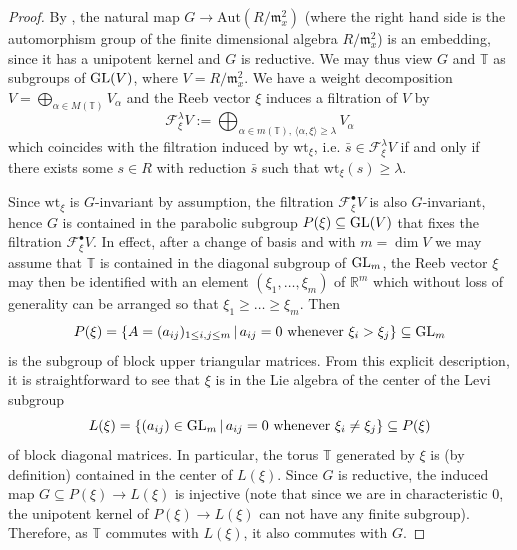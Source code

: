 \documentclass[12pt]{amsart}
\theoremstyle{definition}
\newcommand{\bR}{\mathbb{R}}
\newcommand{\bQ}{\mathbb{Q}}
\newcommand{\bT}{\mathbb{T}}
\newcommand{\cF}{\mathcal{F}}
\newcommand{\fm}{\mathfrak{m}}
\newcommand{\Aut}{\mathrm{Aut}}
\newcommand{\wt}{\mathrm{wt}}
\numberwithin{equation}{section}
\begin{document}
\begin{proof}
By \cite[8.4]{Kol-cone-auto}, the natural map $G\to \Aut(R/\fm_x^2)$ (where the right hand side is the automorphism group of the finite dimensional algebra $R/\fm_x^2$) is an embedding, since it has a unipotent kernel and $G$ is reductive. We may thus view $G$ and $\bT$ as subgroups of ${\rm GL}(V)$, where $V=R/\fm_x^2$. We have a weight decomposition $V = \bigoplus_{\alpha\in M(\bT)} V_\alpha$ and the Reeb vector $\xi$ induces a filtration of $V$ by 
\[
\cF_\xi^\lambda V := \bigoplus_{\alpha\in m(\bT),\,\langle\alpha,\xi\rangle\ge \lambda} V_\alpha
\]
which coincides with the filtration induced by $\wt_\xi$, i.e. $\bar{s}\in \cF_\xi^\lambda V$ if and only if there exists some $s\in R$ with reduction $\bar{s}$ such that $\wt_\xi (s)\ge \lambda$. 

Since $\wt_\xi$ is $G$-invariant by assumption, the filtration $\cF_\xi^\bullet V$ is also $G$-invariant, hence $G$ is contained in the parabolic subgroup $P(\xi)\subseteq {\rm GL}(V)$ that fixes the filtration $\cF_\xi^\bullet V$. In effect, after a change of basis and with $m=\dim V$ we may assume that $\bT$ is contained in the diagonal subgroup of ${\rm GL}_m$, the Reeb vector $\xi$ may then be identified with an element $(\xi_1,\dots,\xi_m)$ of $\bR^m$ which without loss of generality can be arranged so that $\xi_1\ge \dots\ge\xi_m$. Then
\[
P(\xi) = \{A=(a_{ij})_{1\le i,j\le m}\,|\,a_{ij}=0 \mbox{ whenever } \xi_i>\xi_j\}\subseteq {\rm GL}_m
\]
is the subgroup of block upper triangular matrices. From this explicit description, it is straightforward to see that $\xi$ is in the Lie algebra of the center of the Levi subgroup
\[
L(\xi) = \{(a_{ij})\in {\rm GL}_m\,|\,a_{ij}=0 \mbox{ whenever } \xi_i\neq \xi_j\} \subseteq P(\xi)
\]
of block diagonal matrices. In particular, the torus $\bT$ generated by $\xi$ is (by definition) contained in the center of $L(\xi)$. Since $G$ is reductive, the induced map $G\subseteq P(\xi)\to L(\xi)$ is injective (note that since we are in characteristic $0$, the unipotent kernel of $P(\xi)\to L(\xi)$ can not have any finite subgroup). Therefore, as $\bT$ commutes with $L(\xi)$, it also commutes with $G$.
\end{proof}

\end{document}

